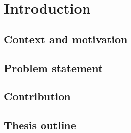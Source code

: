 \chapter{Introduction}
\label{ch:introduction}


\section{Context and motivation}
\label{sec:intro-context}


\section{Problem statement}
\label{sec:intro-problem}

\section{Contribution}
\label{sec:intro-contribution}

\section{Thesis outline}
\label{sec:intro-outline}
